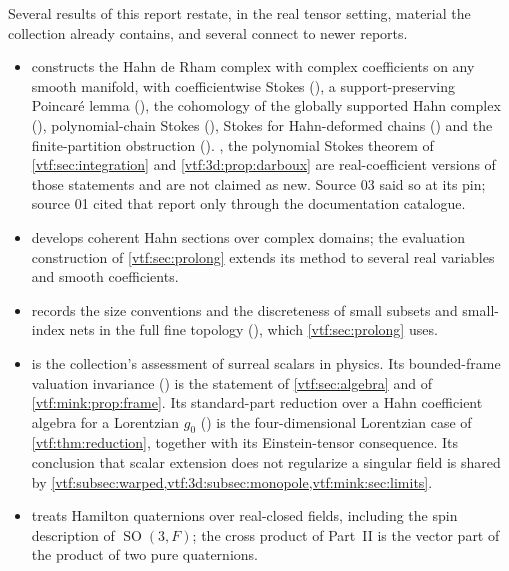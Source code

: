 \documentclass[11pt,letterpaper]{article}
\theoremstyle{definition}
\theoremstyle{remark}
\newcommand{\SO}{\operatorname{SO}}\newcommand{\SL}{\operatorname{SL}}
\begin{document}
Several results of this report restate, in the real tensor setting, material the
collection already contains, and several connect to newer reports.
\begin{itemize}
\item {} constructs the Hahn de Rham
complex with complex coefficients on any smooth manifold, with coefficientwise
Stokes (), a support-preserving Poincar\'e lemma
(), the cohomology of the globally supported
Hahn complex (), polynomial-chain Stokes
(), Stokes for Hahn-deformed chains
() and the finite-partition obstruction
(). ,
the polynomial Stokes theorem of \cref{vtf:sec:integration} and
\cref{vtf:3d:prop:darboux} are real-coefficient versions of those statements and
are not claimed as new. Source 03 said so at its pin; source 01 cited that report
only through the documentation catalogue.
\item {} develops coherent Hahn sections over
complex domains; the evaluation construction of \cref{vtf:sec:prolong} extends
its method to several real variables and smooth coefficients.
\item {} records the size
conventions and the discreteness of small subsets and small-index nets in the
full fine topology (), which \cref{vtf:sec:prolong}
uses.
\item {} is the collection's
assessment of surreal scalars in physics. Its bounded-frame valuation invariance
() is the statement of \cref{vtf:sec:algebra} and of
\cref{vtf:mink:prop:frame}. Its standard-part reduction over a Hahn coefficient
algebra for a Lorentzian $g_0$ () is the
four-dimensional Lorentzian case of \cref{vtf:thm:reduction}, together with its
Einstein-tensor consequence. Its conclusion that scalar extension does not
regularize a singular field is shared by
\cref{vtf:subsec:warped,vtf:3d:subsec:monopole,vtf:mink:sec:limits}.
\item {} treats Hamilton quaternions over
real-closed fields, including the spin description of $\SO(3,F)$; the cross
product of Part~II is the vector part of the product of two pure quaternions.

\end{itemize}
\end{document}
